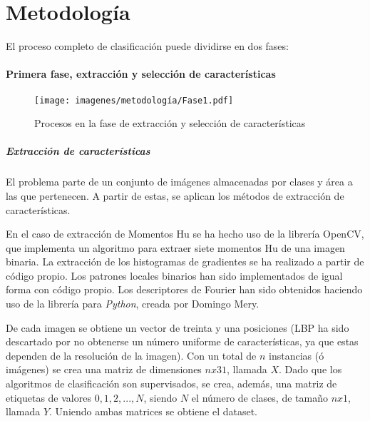 \chapter{Metodología}

El proceso completo de clasificación puede dividirse en dos fases:

\subsubsection{Primera fase, extracción y selección de características}

\begin{figure}[H]
	\centering
	\captionsetup{justification=centering}
	\texttt{[image: imagenes/metodología/Fase1.pdf]}
	\caption{Procesos en la fase de extracción y selección de características}
	\label{met:fase1}
\end{figure}

\paragraph{Extracción de características}

El problema parte de un conjunto de imágenes almacenadas por clases y área a las que pertenecen. A partir de estas, se aplican los métodos de extracción de características. 

En el caso de extracción de Momentos Hu se ha hecho uso de la librería OpenCV, que implementa un algoritmo para extraer siete momentos Hu de una imagen binaria. 
La extracción de los histogramas de gradientes se ha realizado a partir de código propio. Los patrones locales binarios han sido implementados de igual forma con código propio. Los descriptores de Fourier han sido obtenidos haciendo uso de la librería \cite{Pybalu} para \textit{Python}, creada por Domingo Mery.


De cada imagen se obtiene un vector de treinta y una posiciones (LBP ha sido descartado por no obtenerse un número uniforme de características, ya que estas dependen de la resolución de la imagen). Con un total de $n$ instancias (ó imágenes) se crea una matriz de dimensiones $nx31$, llamada $X$. Dado que los algoritmos de clasificación son supervisados, se crea, además, una matriz de etiquetas de valores $0,1,2,...,N$, siendo $N$ el número de clases, de tamaño $nx1$, llamada $Y$. Uniendo ambas matrices se obtiene el dataset.

